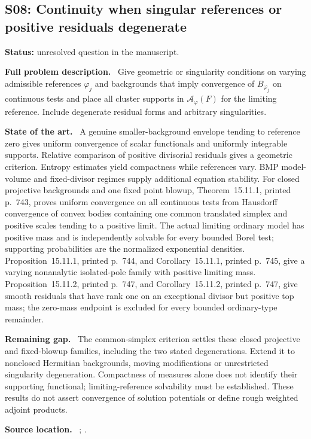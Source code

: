 \documentclass[11pt]{article}
\newcommand{\field}[1]{\par\medskip\noindent\textbf{#1.}\ }
\begin{document}
\subsection{S08: Continuity when singular references or positive residuals degenerate}
\label{S08}
\noindent\textbf{Status:} unresolved question in the manuscript.
\field{Full problem description} Give geometric or singularity conditions on varying admissible references $\varphi_j$ and backgrounds that imply convergence of $B_{\varphi_j}$ on continuous tests and place all cluster supports in $\mathcal A_\varphi(F)$ for the limiting reference. Include degenerate residual forms and arbitrary singularities.
\field{State of the art} A genuine smaller-background envelope tending to reference zero gives uniform convergence of scalar functionals and uniformly integrable supports. Relative comparison of positive divisorial residuals gives a geometric criterion. Entropy estimates yield compactness while references vary. BMP model-volume and fixed-divisor regimes supply additional equation stability. For closed projective backgrounds and one fixed point blowup, Theorem~15.11.1, printed p.~743, proves uniform convergence on all continuous tests from Hausdorff convergence of convex bodies containing one common translated simplex and positive scales tending to a positive limit. The actual limiting ordinary model has positive mass and is independently solvable for every bounded Borel test; supporting probabilities are the normalized exponential densities. Proposition~15.11.1, printed p.~744, and Corollary~15.11.1, printed p.~745, give a varying nonanalytic isolated-pole family with positive limiting mass. Proposition~15.11.2, printed p.~747, and Corollary~15.11.2, printed p.~747, give smooth residuals that have rank one on an exceptional divisor but positive top mass; the zero-mass endpoint is excluded for every bounded ordinary-type remainder.
\field{Remaining gap} The common-simplex criterion settles these closed projective and fixed-blowup families, including the two stated degenerations. Extend it to nonclosed Hermitian backgrounds, moving modifications or unrestricted singularity degeneration. Compactness of measures alone does not identify their supporting functional; limiting-reference solvability must be established. These results do not assert convergence of solution potentials or define rough weighted adjoint products.
\field{Source location} ; .
\end{document}

